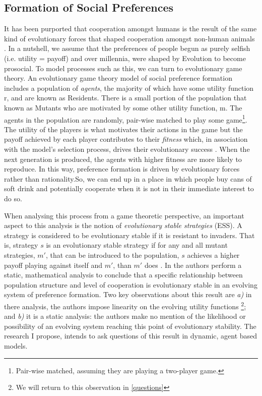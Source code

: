 \documentclass[11pt]{article}
\newcommand*{\np}{\par\noindent\newline}
\begin{document}
\subsection{Formation of Social Preferences}\label{formation_social_preferences}
It has been purported that cooperation amongst humans is the result of the same
kind of evolutionary forces that shaped cooperation amongst non-human animals
\cite{silk_evolution_2016}. In a nutshell, we assume that the preferences of
people begun as purely selfish (i.e. utility = payoff) and over millennia, were
shaped by Evolution to become prosocial. To model processes such as this, we
can turn to evolutionary game theory. An evolutionary game theory model of
social preference formation includes a population of \textit{agents}, the
majority of which have some utility function r, and are known as Residents.
There is a small portion of the population that known as Mutants who are
motivated by some other utility function, m. The agents in the population are
randomly, pair-wise matched to play some game\footnote{Pair-wise matched,
assuming they are playing a two-player game.}. The utility of the players is
what motivates their actions in the game but the  payoff achieved by each
player contributes to their \textit{fitness} which, in association with the
model's selection process, drives their evolutionary success . When the next
generation is produced, the agents with higher fitness are more likely to
reproduce. In this way, preference formation is driven by evolutionary
forces rather than rationality.So, we can end up in a place in which people
buy cans of soft drink and potentially cooperate when it is not in their
immediate interest to do so.

\np When analysing this process from a game theoretic perspective, an important
aspect to this analysis is the notion of \textit{evolutionary stable
strategies} (ESS). A strategy is considered to be evolutionary stable if it is
resistant to invaders. That is, strategy $s$ is an evolutionary stable strategy
if for any and all mutant strategies, $m'$, that can be introduced to the
population, $s$ achieves a higher payoff playing against itself and $m'$, than
$m'$ does \cite{shoham_multiagent_nodate}. In \cite{alger_homo_2013} the
authors perform a static, mathematical analysis to conclude that a specific
relationship between population structure and level of cooperation is
evolutionary stable in an evolving system of preference formation. Two key
observations about this result are \textit{a)} in there analysis, the authors
impose linearity on the evolving utility functions \footnote{We will return to
this observation in \ref{questions}}; and \textit{b)} it is a static analysis:
the authors make no mention of the likelihood or possibility of an evolving
system reaching this point of evolutionary stability. The research I propose,
intends to ask questions of this result in dynamic, agent based models.
\end{document}
